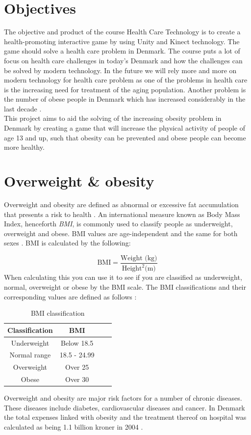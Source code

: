 \documentclass[11pt]{report}
\begin{document}
\section{Objectives}
The objective and product of the course Health Care Technology is to create a health-promoting interactive game by using Unity and Kinect technology. The game should solve a health care problem in Denmark. The course puts a lot of focus on health care challenges in today's Denmark and how the challenges can be solved by modern technology. In the future we will rely more and more on modern technology for health care problem as one of the problems in health care is the increasing need for treatment of the aging population. Another problem is the number of obese people in Denmark which has increased considerably in the last decade \cite{Sundhedsstyrelsen}.\\
This project aims to aid the solving of the increasing obesity problem in Denmark by creating a game that will increase the physical activity of people of age 13 and up, such that obesity can be prevented and obese people can become more healthy.

\section{Overweight \& obesity}
Overweight and obesity are defined as abnormal or excessive fat accumulation that presents a risk to health \cite{who-obesity}. An international measure known as Body Mass Index, henceforth \emph{BMI}, is commonly used to classify people as underweight, overweight and obese. BMI values are age-independent and the same for both sexes \cite{who-bmi}. BMI is calculated by the following:

$$\text{BMI}=\frac{\text{Weight (kg)}}{\text{Height}^2 \text{(m)}}$$
When calculating this you can use it to see if you are classified as underweight, normal, overweight or obese by the BMI scale. The BMI classifications and their corresponding values are defined as follows \cite{who-bmi}:
\begin{table}[H]
\centering
\caption{BMI classification}
\begin{tabular}{| c | c | c | c}
\hline
\textbf{Classification} & \textbf{BMI}\\ \hline
Underweight & Below 18.5 \\ \hline
Normal range & 18.5 - 24.99 \\ \hline
Overweight & Over 25\\ \hline
Obese & Over 30 \\ \hline
\end{tabular}
\end{table}
Overweight and obesity are major risk factors for a number of chronic diseases. These diseases include diabetes, cardiovascular diseases and cancer. In Denmark the total expenses linked with obesity and the treatment thereof on hospital was calculated as being 1.1 billion kroner in 2004 \cite{consequences-obese}.
\end{document}
